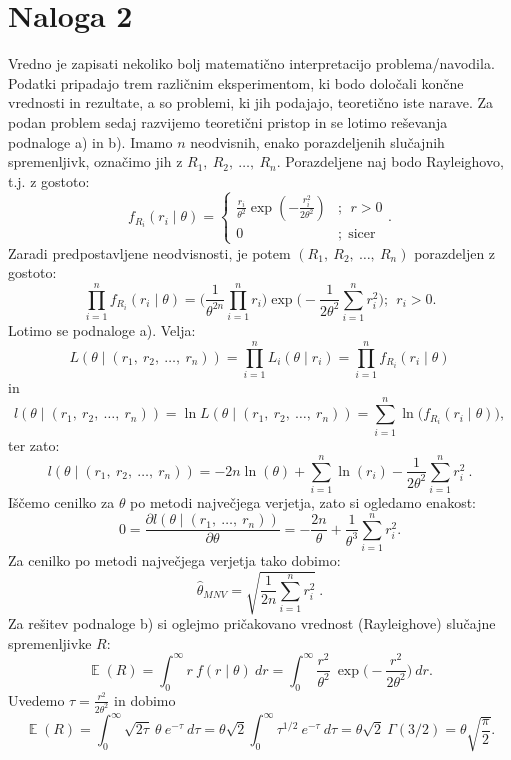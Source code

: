 \documentclass{article}
\DeclareMathOperator{\EX}{\mathbb{E}}
\begin{document}
\pagebreak

\section{Naloga 2}
Vredno je zapisati nekoliko bolj matematično interpretacijo problema/navodila. 
Podatki pripadajo trem različnim eksperimentom, ki bodo določali končne vrednosti in rezultate, a so problemi, ki jih podajajo, teoretično iste narave. 
Za podan problem sedaj razvijemo teoretični pristop in se lotimo reševanja podnaloge a) in b). 
\newline
Imamo $n$ neodvisnih, enako porazdeljenih slučajnih spremenljivk, označimo jih z $R_1,~R_2,~\dots,~R_n$. 
Porazdeljene naj bodo Rayleighovo, t.j. z gostoto:
$$
f_{R_i}(r_{i} \mid \theta)=\left\{\begin{array}{cl}
\frac{r_i}{\theta^{2}} \exp \left(-\frac{r_{i}^{2}}{2 \theta^{2}}\right) & ;~~r>0 \\
0 & ;~~\text{sicer }
\end{array}\right. .
$$
Zaradi predpostavljene neodvisnosti, je potem $(R_1,~R_2,~\dots,~R_n)$ porazdeljen z gostoto:
$$
    \prod_{i=1}^{n}{f_{R_i}(r_{i} \mid \theta)} = 
    \bigg(\frac{1}{\theta^{2n}}\prod_{i=1}^{n}{r_i}\bigg) \exp\bigg(-\frac{1}{2 \theta^{2}} \sum_{i=1}^{n}{r_i^2}\bigg);~~r_i>0.
$$
Lotimo se podnaloge a). Velja:
$$
L(\theta \mid (r_1,~r_2,~\dots,~r_n)) = \prod_{i=1}^{n}{L_i(\theta \mid r_i)} = \prod_{i=1}^{n}{f_{R_i}(r_i \mid \theta)}
$$
in
$$
l(\theta \mid (r_1,~r_2,~\dots,~r_n)) = \ln L(\theta \mid (r_1,~r_2,~\dots,~r_n)) = \sum_{i=1}^{n}{\ln \big(f_{R_i}(r_i \mid \theta)\big)}, 
$$
ter zato:
$$
l(\theta \mid (r_1,~r_2,~\dots,~r_n)) = -2n \ln(\theta) + \sum_{i=1}^{n}{\ln(r_i)} - \frac{1}{2\theta^2} \sum_{i=1}^{n}{r_i^2}~.
$$
Iščemo cenilko za $\theta$ po metodi največjega verjetja, zato si ogledamo enakost:
$$
0 = \frac{\partial l(\theta \mid (r_1,~\dots,~r_n))}{\partial \theta} = - \frac{2n}{\theta} + \frac{1}{\theta^3}\sum_{i=1}^{n}{r_i^2}.
$$
Za cenilko po metodi največjega verjetja tako dobimo:
$$
\hat{\theta}_{MNV} = \sqrt{\frac{1}{2n}{\sum_{i=1}^{n}{r_i^2}}}~.
$$
Za rešitev podnaloge b) si oglejmo pričakovano vrednost (Rayleighove) slučajne spremenljivke $R$:
$$
\EX(R) = \int_{0}^{\infty}{r~f(r \mid \theta)~dr}= \int_{0}^{\infty}{\frac{r^2}{\theta^{2}}~\exp\Big(-\frac{r^{2}}{2 \theta^{2}}\Big)~dr}.
$$
Uvedemo $\tau = \frac{r^{2}}{2 \theta^{2}}$ in dobimo
$$
\EX(R) = \int_{0}^{\infty}{\sqrt{2 \tau}~\theta ~e^{-\tau}~ d \tau} = \theta \sqrt{2}\int_{0}^{\infty}{\tau^{1/2}~e^{-\tau}~ d \tau} = \theta\sqrt{2}~\Gamma(3/2) = \theta \sqrt{\frac{\pi}{2}}.
$$
\end{document}
